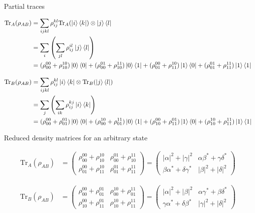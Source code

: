 \documentclass[aspectratio=1610]{beamer}					%
\begin{document}
\begin{frame}{Partial traces}

\begin{align*}
\mathrm{Tr}_{A}(\rho_{AB}) &= \sum_{ijkl} \rho_{ij}^{kl} \mathrm{Tr}_{A}(\ket{i}\bra{k}) \otimes \ket{j}\bra{l}\\
&= \sum_{i} \left(\sum_{jl} \rho_{ij}^{il} \ket{j}\bra{l}\right)\\
&= (\rho_{00}^{00}+\rho_{10}^{10})\ket{0}\bra{0} + (\rho_{00}^{01}+\rho_{10}^{11})\ket{0}\bra{1} + (\rho_{01}^{00}+\rho_{11}^{10})\ket{1}\bra{0} + (\rho_{01}^{01}+\rho_{11}^{11})\ket{1}\bra{1}
\end{align*}

\begin{align*}
\mathrm{Tr}_{B}(\rho_{AB}) &= \sum_{ijkl} \rho_{ij}^{kl} \ket{i}\bra{k} \otimes \mathrm{Tr}_{B}(\ket{j}\bra{l})\\
&= \sum_{j} \left(\sum_{ik} \rho_{ij}^{kj} \ket{i}\bra{k}\right)\\
&= (\rho_{00}^{00}+\rho_{01}^{01})\ket{0}\bra{0} + (\rho_{00}^{10}+\rho_{01}^{11})\ket{0}\bra{1} + (\rho_{10}^{00}+\rho_{11}^{01})\ket{1}\bra{0} + (\rho_{10}^{10}+\rho_{11}^{11})\ket{1}\bra{1}
\end{align*}

\end{frame}

\begin{frame}{Reduced density matrices for an arbitrary state}

\begin{align*}
\mathrm{Tr}_{A}(\rho_{AB}) &=
\begin{pmatrix}
\rho_{00}^{00}+\rho_{10}^{10} & \rho_{00}^{01}+\rho_{10}^{11}\\
\rho_{01}^{00}+\rho_{11}^{10} & \rho_{01}^{01}+\rho_{11}^{11}
\end{pmatrix}
= \begin{pmatrix}
|\alpha|^{2} + |\gamma|^{2} & \alpha\beta^{*} + \gamma\delta^{*}\\
\beta\alpha^{*} + \delta\gamma^{*} & |\beta|^{2} + |\delta|^{2}
\end{pmatrix}
\end{align*}

\begin{align*}
\mathrm{Tr}_{B}(\rho_{AB}) &=
\begin{pmatrix}
\rho_{00}^{00}+\rho_{01}^{01} & \rho_{00}^{10}+\rho_{01}^{11}\\
\rho_{10}^{00}+\rho_{11}^{01} & \rho_{10}^{10}+\rho_{11}^{11}
\end{pmatrix}
= \begin{pmatrix}
|\alpha|^{2} + |\beta|^{2} & \alpha\gamma^{*} + \beta\delta^{*}\\
\gamma\alpha^{*} + \delta\beta^{*} & |\gamma|^{2} + |\delta|^{2}
\end{pmatrix}
\end{align*}

\end{frame}
\end{document}
